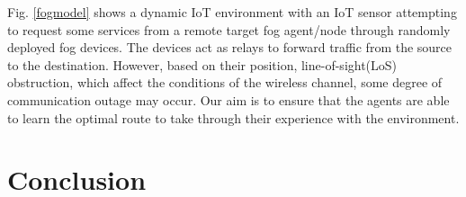 \documentclass[journal]{IEEEtran}
\begin{document}
Fig. \ref{fogmodel} shows a dynamic IoT environment with an IoT sensor attempting to request some services from a remote target fog agent/node through randomly deployed fog devices. The devices act as relays to forward traffic from the source to the destination. However, based on their position, line-of-sight(LoS) obstruction, which affect the conditions of the wireless channel, some degree of communication outage may occur. Our aim is to ensure that the agents are able to learn the optimal route to take through their experience with the environment.

%
%
%
%


\section{Conclusion}\label{sec:conclusions}









\ifCLASSOPTIONcaptionsoff
  \newpage
\fi


\end{document}
